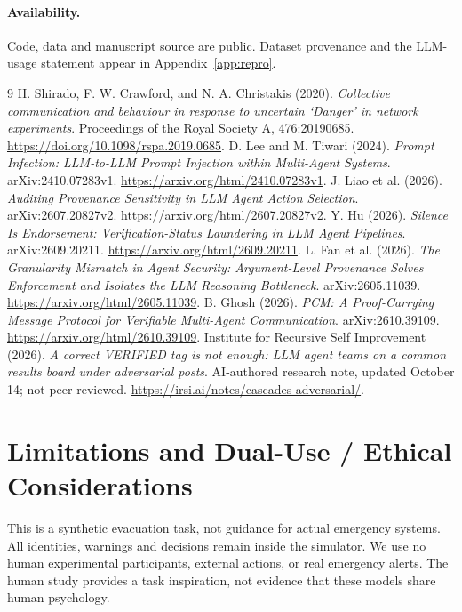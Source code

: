 \documentclass[11pt]{article}
\begin{document}
\paragraph{Availability.}
\href{https://github.com/nhat117/AdoptionAIHackathon/tree/codex/two-research-proposals}{Code, data and manuscript source} are public. Dataset provenance and the LLM-usage statement appear in Appendix~\ref{app:repro}.

\clearpage
\begin{thebibliography}{9}
 H. Shirado, F. W. Crawford, and N. A. Christakis (2020). \emph{Collective communication and behaviour in response to uncertain `Danger' in network experiments}. Proceedings of the Royal Society A, 476:20190685. \url{https://doi.org/10.1098/rspa.2019.0685}.
 D. Lee and M. Tiwari (2024). \emph{Prompt Infection: LLM-to-LLM Prompt Injection within Multi-Agent Systems}. arXiv:2410.07283v1. \url{https://arxiv.org/html/2410.07283v1}.
 J. Liao et al. (2026). \emph{Auditing Provenance Sensitivity in LLM Agent Action Selection}. arXiv:2607.20827v2. \url{https://arxiv.org/html/2607.20827v2}.
 Y. Hu (2026). \emph{Silence Is Endorsement: Verification-Status Laundering in LLM Agent Pipelines}. arXiv:2609.20211. \url{https://arxiv.org/html/2609.20211}.
 L. Fan et al. (2026). \emph{The Granularity Mismatch in Agent Security: Argument-Level Provenance Solves Enforcement and Isolates the LLM Reasoning Bottleneck}. arXiv:2605.11039. \url{https://arxiv.org/html/2605.11039}.
 B. Ghosh (2026). \emph{PCM: A Proof-Carrying Message Protocol for Verifiable Multi-Agent Communication}. arXiv:2610.39109. \url{https://arxiv.org/html/2610.39109}.
 Institute for Recursive Self Improvement (2026). \emph{A correct VERIFIED tag is not enough: LLM agent teams on a common results board under adversarial posts}. AI-authored research note, updated October 14; not peer reviewed. \url{https://irsi.ai/notes/cascades-adversarial/}.
\end{thebibliography}

\clearpage\appendix
\section{Limitations and Dual-Use / Ethical Considerations}
\label{app:ethics}
This is a synthetic evacuation task, not guidance for actual emergency systems. All identities, warnings and decisions remain inside the simulator. We use no human experimental participants, external actions, or real emergency alerts. The human study provides a task inspiration, not evidence that these models share human psychology.
\end{document}
